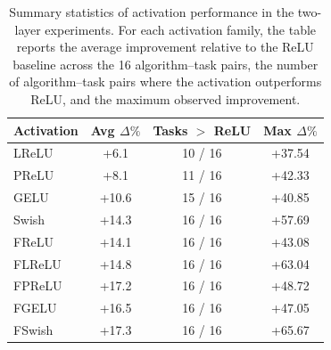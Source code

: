 \begin{table}[!htbp]
\centering
\caption{Summary statistics of activation performance in the two-layer experiments. For each activation family, the table reports the average improvement relative to the ReLU baseline across the 16 algorithm--task pairs, the number of algorithm--task pairs where the activation outperforms ReLU, and the maximum observed improvement.}
\label{tab:activation-summary}
\small
\setlength{\tabcolsep}{6pt}
\renewcommand{\arraystretch}{1.1}
\begin{tabular}{lccc}
\toprule
Activation & Avg $\Delta\%$ & Tasks $>$ ReLU & Max $\Delta\%$ \\
\midrule
LReLU & +6.1 & 10 / 16 & +37.54 \\
PReLU & +8.1 & 11 / 16 & +42.33 \\
GELU & +10.6 & 15 / 16 & +40.85 \\
Swish & +14.3 & 16 / 16 & +57.69 \\
FReLU & +14.1 & 16 / 16 & +43.08 \\
FLReLU & +14.8 & 16 / 16 & +63.04 \\
FPReLU & +17.2 & 16 / 16 & +48.72 \\
FGELU & +16.5 & 16 / 16 & +47.05 \\
FSwish & +17.3 & 16 / 16 & +65.67 \\
\bottomrule
\end{tabular}
\end{table}
